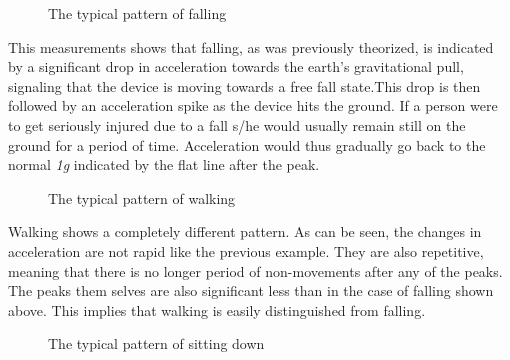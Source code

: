 \documentclass[12pt, a4paper, onecolumn]{article}
\begin{document}
		\begin{figure}[h]
			\centering
			\caption{The typical pattern of falling}%
			\label{fig:example}%
		\end{figure}
	
		\noindent This measurements shows that falling, as was previously theorized, is indicated by a significant drop in acceleration towards the earth's gravitational pull, signaling that the device is moving towards a free fall state.This drop is then followed by an acceleration spike as the device hits the ground. If a person were to get seriously injured due to a fall s/he would usually remain still on the ground for a period of time. Acceleration would thus gradually go back to the normal \textit{1g} indicated by the flat line after the peak. 
	
	
		\begin{figure}[h]
			\centering
			\caption{The typical pattern of walking}%
			\label{fig:example}%
		\end{figure}
	
		\noindent Walking shows a completely different pattern. As can be seen, the changes in acceleration are not rapid like the previous example. They are also repetitive, meaning that there is no longer period of non-movements after any of the peaks. The peaks them selves are also significant less than in the case of falling shown above. This implies that walking is easily distinguished from falling.
	
	
	
		\begin{figure}[h]
			\centering
			\caption{The typical pattern of sitting down}%
			\label{fig:example}%
		\end{figure}
	
\end{document}
